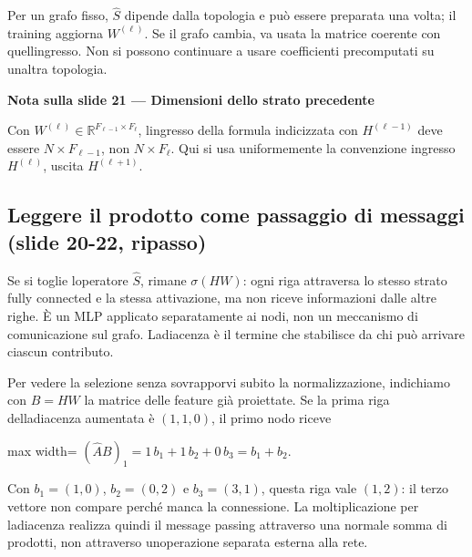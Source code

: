 \documentclass[11pt,a4paper,oneside,openany]{book}
\renewenvironment{quote}{\list{}{\leftmargin=1em\rightmargin=0pt}\item\relax}{\endlist}
\begin{document}
Per un grafo fisso, \(\widehat S\) dipende dalla topologia e può essere preparata una volta; il training aggiorna \(W^{(\ell)}\). Se il grafo cambia, va usata la matrice coerente con quell\textquotesingle ingresso. Non si possono continuare a usare coefficienti precomputati su un\textquotesingle altra topologia.

\begin{quote}
\textbf{Nota sulla slide 21 --- Dimensioni dello strato precedente}
\end{quote}

\begin{quote}
Con \(W^{(\ell)}\in\mathbb R^{F_{\ell-1}\times F_\ell}\), l\textquotesingle ingresso della formula indicizzata con \(H^{(\ell-1)}\) deve essere \(N\times F_{\ell-1}\), non \(N\times F_\ell\). Qui si usa uniformemente la convenzione ingresso \(H^{(\ell)}\), uscita \(H^{(\ell+1)}\).
\end{quote}

\subsection{Leggere il prodotto come passaggio di messaggi (slide 20-22, ripasso)}\label{f05-n30-r199}

Se si toglie l\textquotesingle operatore \(\widehat S\), rimane \(\sigma(HW)\): ogni riga attraversa lo stesso strato fully connected e la stessa attivazione, ma non riceve informazioni dalle altre righe. È un MLP applicato separatamente ai nodi, non un meccanismo di comunicazione sul grafo. L\textquotesingle adiacenza è il termine che stabilisce da chi può arrivare ciascun contributo.

Per vedere la selezione senza sovrapporvi subito la normalizzazione, indichiamo con \(B=HW\) la matrice delle feature già proiettate. Se la prima riga dell\textquotesingle adiacenza aumentata è \((1,1,0)\), il primo nodo riceve

\begin{center}
\begin{adjustbox}{max width=\linewidth}
$\displaystyle (\widehat A B)_1=1\,b_1+1\,b_2+0\,b_3=b_1+b_2.$
\end{adjustbox}
\end{center}

Con \(b_1=(1,0)\), \(b_2=(0,2)\) e \(b_3=(3,1)\), questa riga vale \((1,2)\): il terzo vettore non compare perché manca la connessione. La moltiplicazione per l\textquotesingle adiacenza realizza quindi il message passing attraverso una normale somma di prodotti, non attraverso un\textquotesingle operazione separata esterna alla rete.
\end{document}

